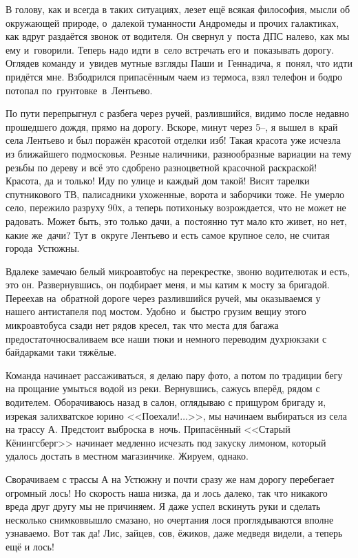 В голову, как и всегда в таких ситуациях, лезет ещё всякая философия, мысли об окружающей природе, о~далекой туманности Андромеды и прочих галактиках, как вдруг раздаётся звонок от водителя. Он свернул у~поста ДПС налево, как мы ему и~говорили. Теперь надо идти в~село встречать его и~показывать дорогу. Оглядев команду и~увидев мутные взгляды Паши и~Геннадича, я~понял, что идти придётся мне. Взбодрился припасённым чаем из термоса, взял телефон и бодро потопал по~грунтовке~в~Лентьево. 
 
По пути перепрыгнул с разбега через ручей, разлившийся, видимо после недавно прошедшего дождя, прямо на дорогу. Вскоре, минут через 5\thinspace\nobreakdash--, я вышел в~край села Лентьево и был поражён красотой отделки изб! Такая красота уже исчезла из ближайшего подмосковья. Резные наличники, разнообразные вариации на тему резьбы по дереву и всё это сдобрено разноцветной красочной раскраской! Красота, да и только! Иду по улице и каждый дом такой! Висят тарелки спутникового ТВ, палисадники ухоженные, ворота и заборчики тоже. Не умерло село, пережило разруху 90\sdash х, а теперь потихоньку возрождается, что не может не радовать. Может быть, это только дачи, а~постоянно тут мало кто живет, но нет, какие же~дачи? Тут в~округе Лентьево и есть самое крупное село, не считая города~Устюжны.

Вдалеке замечаю белый микроавтобус на перекрестке, звоню водителю\mdash так и есть, это он. Развернувшись, он подбирает меня, и мы катим к мосту за бригадой. Переехав на~обратной дороге через разлившийся ручей, мы оказываемся у нашего антистапеля под мостом. Удобно~и~быстро грузим вещи\mdash у этого микроавтобуса сзади нет рядов кресел, так что места для багажа предостаточно\mdash сваливаем все наши тюки и немного переводим дух\mdash рюкзаки с байдарками таки тяжёлые. 

Команда начинает рассаживаться, я делаю пару фото, а потом по традиции бегу на прощание умыться водой из реки. Вернувшись, сажусь вперёд, рядом с водителем. Оборачиваюсь назад в салон, оглядываю с прищуром бригаду и, изрекая залихватское юрино <<Поехали!$\ldots$>>, мы начинаем выбираться из села на трассу А. Предстоит выброска в~ночь. Припасённый <<Старый Кёнингсберг>> начинает медленно исчезать под закуску лимоном, который удалось достать в местном магазинчике. Жируем, однако.

Сворачиваем с трассы А на Устюжну и почти сразу же нам дорогу перебегает огромный лось! Но скорость наша низка, да и лось далеко, так что никакого вреда друг другу мы не причиняем. Я даже успел вскинуть руки и сделать несколько снимков\mdash вышло смазано, но очертания лося проглядываются вполне узнаваемо. Вот так да! Лис, зайцев, сов, ёжиков, даже медведя видели, а теперь ещё и лось! 

